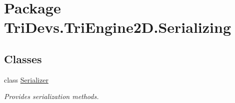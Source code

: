 \hypertarget{namespace_tri_devs_1_1_tri_engine2_d_1_1_serializing}{\section{Package Tri\-Devs.\-Tri\-Engine2\-D.\-Serializing}
\label{namespace_tri_devs_1_1_tri_engine2_d_1_1_serializing}
}
\subsection*{Classes}
\begin{DoxyCompactItemize}
\item 
class \hyperlink{class_tri_devs_1_1_tri_engine2_d_1_1_serializing_1_1_serializer}{Serializer}
\begin{DoxyCompactList}\small\item\em Provides serialization methods. \end{DoxyCompactList}\end{DoxyCompactItemize}

